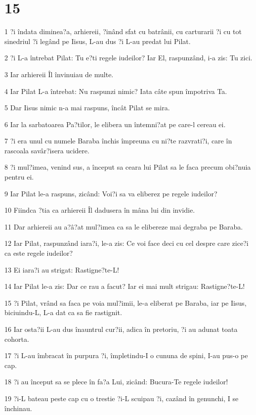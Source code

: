 \chapter{15}

\par 1 ?i îndata diminea?a, arhiereii, ?inând sfat cu batrânii, cu carturarii ?i cu tot sinedriul ?i legând pe Iisus, L-au dus ?i L-au predat lui Pilat.
\par 2 ?i L-a întrebat Pilat: Tu e?ti regele iudeilor? Iar El, raspunzând, i-a zis: Tu zici.
\par 3 Iar arhiereii Îl învinuiau de multe.
\par 4 Iar Pilat L-a întrebat: Nu raspunzi nimic? Iata câte spun împotriva Ta.
\par 5 Dar Iisus nimic n-a mai raspuns, încât Pilat se mira.
\par 6 Iar la sarbatoarea Pa?tilor, le elibera un întemni?at pe care-l cereau ei.
\par 7 ?i era unul cu numele Baraba închis împreuna cu ni?te razvrati?i, care în rascoala savâr?isera ucidere.
\par 8 ?i mul?imea, venind sus, a început sa ceara lui Pilat sa le faca precum obi?nuia pentru ei.
\par 9 Iar Pilat le-a raspuns, zicând: Voi?i sa va eliberez pe regele iudeilor?
\par 10 Fiindca ?tia ca arhiereii Îl dadusera în mâna lui din invidie.
\par 11 Dar arhiereii au a?â?at mul?imea ca sa le elibereze mai degraba pe Baraba.
\par 12 Iar Pilat, raspunzând iara?i, le-a zis: Ce voi face deci cu cel despre care zice?i ca este regele iudeilor?
\par 13 Ei iara?i au strigat: Rastigne?te-L!
\par 14 Iar Pilat le-a zis: Dar ce rau a facut? Iar ei mai mult strigau: Rastigne?te-L!
\par 15 ?i Pilat, vrând sa faca pe voia mul?imii, le-a eliberat pe Baraba, iar pe Iisus, biciuindu-L, L-a dat ca sa fie rastignit.
\par 16 Iar osta?ii L-au dus înauntrul cur?ii, adica în pretoriu, ?i au adunat toata cohorta.
\par 17 ?i L-au îmbracat în purpura ?i, împletindu-I o cununa de spini, I-au pus-o pe cap.
\par 18 ?i au început sa se plece în fa?a Lui, zicând: Bucura-Te regele iudeilor!
\par 19 ?i-L bateau peste cap cu o trestie ?i-L scuipau ?i, cazând în genunchi, I se închinau.
